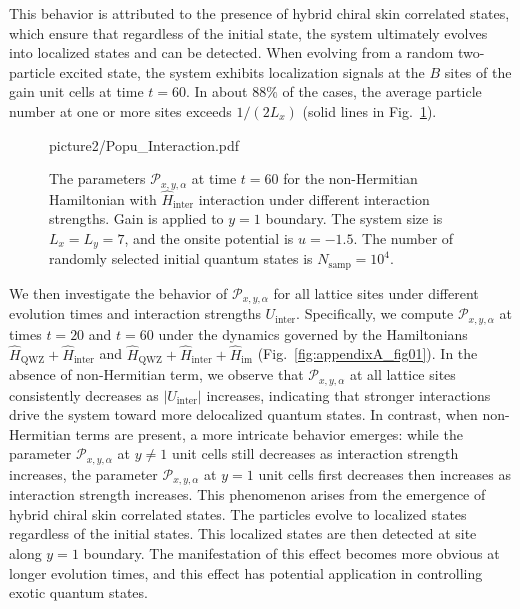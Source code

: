 \documentclass[longbibliography, aps, prx, amsmath, amssymb, amsfonts, twocolumn,superscriptaddress, footinbib]{revtex4-1}
\begin{document}
	This behavior is attributed to the presence of hybrid chiral skin correlated states, which ensure that regardless of the initial state, the system ultimately evolves into localized states and can be detected.
	When evolving from a random two-particle excited state, the system exhibits localization signals at the $B$ sites of the gain unit cells at time $t=60$.
	In about $88\%$ of the cases, the average particle number at one or more sites exceeds $1/(2L_x)$ (solid lines in Fig.~\ref{fig:02_Supple}).
	\begin{figure}[htbp]
		\begin{overpic}[width=0.95\linewidth]{picture2/Popu_Interaction.pdf}
		\end{overpic}
		\caption{The parameters $\mathcal{P}_{x,y,\alpha}$ at time $t=60$ for the non-Hermitian Hamiltonian with $\hat{H}_{\text{inter}}$ interaction under different interaction strengths. Gain is applied to $y=1$ boundary. The system size is $L_x=L_y=7$, and the onsite potential is $u=-1.5$. The number of randomly selected initial quantum states is $N_{\text{samp}}=10^4$.}
		\label{fig:02_Supple}
	\end{figure}



	We then investigate the behavior of $\mathcal{P}_{x,y,\alpha}$ for all lattice sites under different evolution times and interaction strengths $U_{\text{inter}}$. Specifically, we compute $\mathcal{P}_{x,y,\alpha}$ at times $t = 20$ and $t = 60$ under the dynamics governed by the Hamiltonians $\hat{H}_{\text{QWZ}} + \hat{H}_{\text{inter}}$ and $\hat{H}_{\text{QWZ}} + \hat{H}_{\text{inter}} + \hat{H}_{\text{im}}$ (Fig.~\ref{fig:appendixA_fig01}). 
	In the absence of non-Hermitian term, we observe that $\mathcal{P}_{x,y,\alpha}$ at all lattice sites consistently decreases as $\lvert U_{\text{inter}} \rvert$ increases, indicating that stronger interactions drive the system toward more delocalized quantum states. 
	In contrast, when non-Hermitian terms are present, a more intricate behavior emerges: while the parameter $\mathcal{P}_{x,y,\alpha}$ at $y\neq 1$ unit cells still decreases as interaction strength increases, 
	the parameter $\mathcal{P}_{x,y,\alpha}$ at $y=1$ unit cells first decreases then increases as interaction strength increases.
	This phenomenon arises from the emergence of hybrid chiral skin correlated states. The particles evolve to localized states regardless of the initial states. This localized states are then detected at site along $y=1$ boundary. The manifestation of this effect becomes more obvious at longer evolution times, and this effect has potential application in controlling exotic quantum states.
\end{document}
